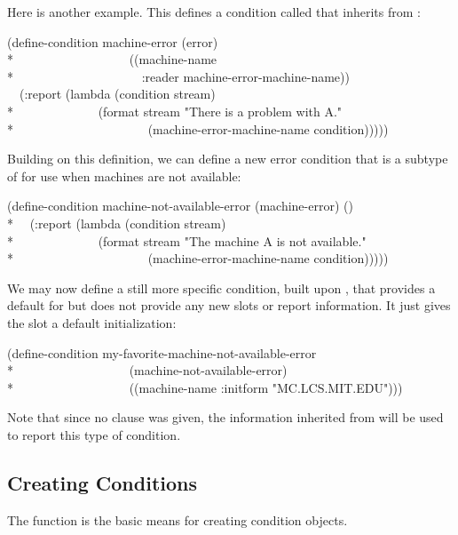 \begin{defmac}
  Here is another example. This defines a condition called 
  that inherits from :
\begin{lisp}
(define-condition machine-error (error) \\*
~~~~~~~~~~~~~~~~~~((machine-name \\*
~~~~~~~~~~~~~~~~~~~~:reader machine-error-machine-name)) \\
~~(:report (lambda (condition stream) \\*
~~~~~~~~~~~~~(format stream "There is a problem with {\Xtilde}A." \\*
~~~~~~~~~~~~~~~~~~~~~(machine-error-machine-name condition)))))
\end{lisp}
  Building on this definition, we can define a new error condition that
  is a subtype of  for use when machines are not available: 
\begin{lisp}
(define-condition machine-not-available-error (machine-error) () \\*
~~(:report (lambda (condition stream) \\*
~~~~~~~~~~~~~(format stream "The machine {\Xtilde}A is not available." \\*
~~~~~~~~~~~~~~~~~~~~~(machine-error-machine-name condition)))))
\end{lisp}
  We may now define a still more specific condition, built upon 
  ,
  that provides a default for 
  but does not provide any new slots or report information. It just
  gives the  slot a default initialization:
\begin{lisp}
(define-condition my-favorite-machine-not-available-error \\*
~~~~~~~~~~~~~~~~~~(machine-not-available-error) \\*
~~~~~~~~~~~~~~~~~~((machine-name :initform "MC.LCS.MIT.EDU")))
\end{lisp}
  Note that since no  clause was given, the information inherited from
   will be used to report this type of condition.
\end{defmac}


\subsection{Creating Conditions}

The function  is the basic means for
creating condition objects.

